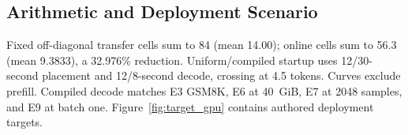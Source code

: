 \subsection{Arithmetic and Deployment Scenario}
Fixed off-diagonal transfer cells sum to 84 (mean 14.00); online cells sum to 56.3 (mean 9.3833), a 32.976\% reduction. Uniform/compiled startup uses 12/30-second placement and 12/8-second decode, crossing at 4.5 tokens. Curves exclude prefill. Compiled decode matches E3 GSM8K, E6 at 40~GiB, E7 at 2048 samples, and E9 at batch one. Figure~\ref{fig:target_gpu} contains authored deployment targets.
